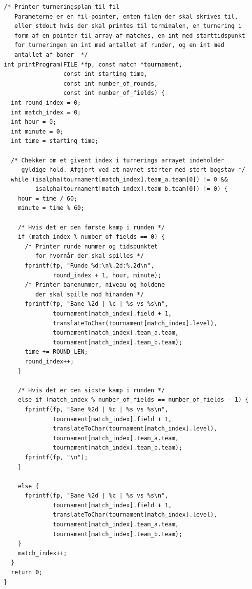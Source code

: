 \begin{listing}
\begin{verbatim}
/* Printer turneringsplan til fil
   Parameterne er en fil-pointer, enten filen der skal skrives til, 
   eller stdout hvis der skal printes til terminalen, en turnering i 
   form af en pointer til array af matches, en int med starttidspunkt 
   for turneringen en int med antallet af runder, og en int med 
   antallet af baner  */
int printProgram(FILE *fp, const match *tournament, 
                 const int starting_time, 
                 const int number_of_rounds,
                 const int number_of_fields) {
  int round_index = 0;
  int match_index = 0;
  int hour = 0;
  int minute = 0;
  int time = starting_time;

  /* Chekker om et givent index i turnerings arrayet indeholder 
     gyldige hold. Afgjort ved at navnet starter med stort bogstav */
  while (isalpha(tournament[match_index].team_a.team[0]) != 0 &&
         isalpha(tournament[match_index].team_b.team[0]) != 0) {
    hour = time / 60;
    minute = time % 60;

    /* Hvis det er den første kamp i runden */
    if (match_index % number_of_fields == 0) {
      /* Printer runde nummer og tidspunktet 
         for hvornår der skal spilles */
      fprintf(fp, "Runde %d:\n%.2d:%.2d\n",
              round_index + 1, hour, minute);
      /* Printer banenummer, niveau og holdene
         der skal spille mod hinanden */
      fprintf(fp, "Bane %2d | %c | %s vs %s\n",
              tournament[match_index].field + 1, 
              translateToChar(tournament[match_index].level),
              tournament[match_index].team_a.team, 
              tournament[match_index].team_b.team);
      time += ROUND_LEN;
      round_index++;
    }

    /* Hvis det er den sidste kamp i runden */
    else if (match_index % number_of_fields == number_of_fields - 1) {
      fprintf(fp, "Bane %2d | %c | %s vs %s\n",
              tournament[match_index].field + 1,
              translateToChar(tournament[match_index].level),
              tournament[match_index].team_a.team, 
              tournament[match_index].team_b.team);
      fprintf(fp, "\n");
    }

    else {
      fprintf(fp, "Bane %2d | %c | %s vs %s\n",
              tournament[match_index].field + 1, 
              translateToChar(tournament[match_index].level),
              tournament[match_index].team_a.team,
              tournament[match_index].team_b.team);
    }
    match_index++;
  }
  return 0;
}
\end{verbatim}
\label{code:printProgram}
\end{listing}



